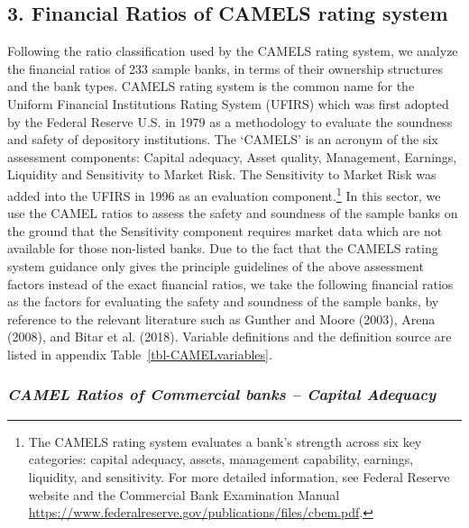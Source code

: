 \documentclass[
  12pt,
  a4paper,
  DIV=11,
  numbers=noendperiod]{scrreprt}
\begin{document}
\subsection{3. Financial Ratios of CAMELS rating
system}\label{financial-ratios-of-camels-rating-system}

Following the ratio classification used by the CAMELS rating system, we
analyze the financial ratios of 233 sample banks, in terms of their
ownership structures and the bank types. CAMELS rating system is the
common name for the Uniform Financial Institutions Rating System (UFIRS)
which was first adopted by the Federal Reserve U.S. in 1979 as a
methodology to evaluate the soundness and safety of depository
institutions. The `CAMELS' is an acronym of the six assessment
components: Capital adequacy, Asset quality, Management, Earnings,
Liquidity and Sensitivity to Market Risk. The Sensitivity to Market Risk
was added into the UFIRS in 1996 as an evaluation component.\footnote{The
  CAMELS rating system evaluates a bank's strength across six key
  categories: capital adequacy, assets, management capability, earnings,
  liquidity, and sensitivity. For more detailed information, see Federal
  Reserve website and the Commercial Bank Examination Manual
  \url{https://www.federalreserve.gov/publications/files/cbem.pdf}.} In
this sector, we use the CAMEL ratios to assess the safety and soundness
of the sample banks on the ground that the Sensitivity component
requires market data which are not available for those non-listed banks.
Due to the fact that the CAMELS rating system guidance only gives the
principle guidelines of the above assessment factors instead of the
exact financial ratios, we take the following financial ratios as the
factors for evaluating the safety and soundness of the sample banks, by
reference to the relevant literature such as Gunther and Moore (2003),
Arena (2008), and Bitar et al. (2018). Variable definitions and the
definition source are listed in appendix Table~\ref{tbl-CAMELvariables}.

\subsubsection{\texorpdfstring{\emph{CAMEL Ratios of Commercial banks --
Capital
Adequacy}}{CAMEL Ratios of Commercial banks -- Capital Adequacy}}\label{camel-ratios-of-commercial-banks-capital-adequacy}
\end{document}
